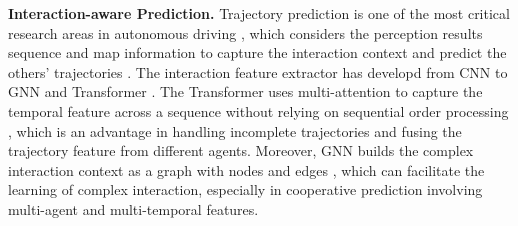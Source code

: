 \noindent \textbf{Interaction-aware Prediction.} Trajectory prediction is one of the most critical research areas in autonomous driving \cite{huang2022survey}, which considers the perception results sequence and map information to capture the interaction context and predict the others' trajectories \cite{gao2020vectornet}. The interaction feature extractor has developd from CNN \cite{deo2018convolutional, song2020pip} to GNN and Transformer \cite{zhou2022hivt, zhou2022comprehensive}. The Transformer uses multi-attention to capture the temporal feature across a sequence without relying on sequential order processing \cite{shi2024mtr++,zhou2023qcnext}, which is an advantage in handling incomplete trajectories and fusing the trajectory feature from different agents. Moreover, GNN builds the complex interaction context as a graph with nodes and edges \cite{trajectron++,jia2023hdgt}, which can facilitate the learning of complex interaction, especially in cooperative prediction involving multi-agent and multi-temporal features.